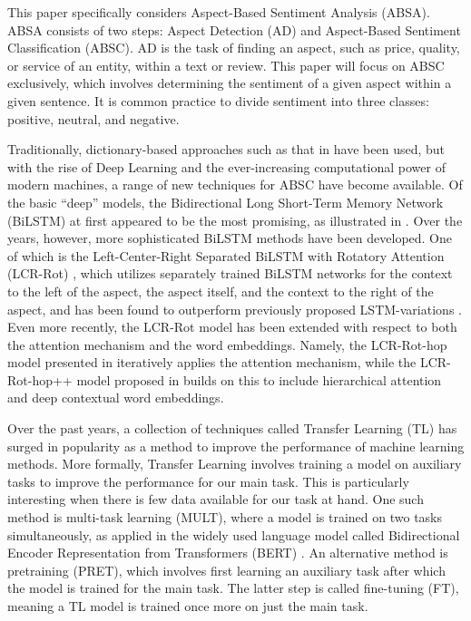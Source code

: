 \documentclass[runningheads]{llncs}
\begin{document}
This paper specifically considers Aspect-Based Sentiment Analysis (ABSA). ABSA consists of two steps: Aspect Detection (AD) and Aspect-Based Sentiment Classification (ABSC). AD is the task of finding an aspect, such as price, quality, or service of an entity, within a text or review. This paper will focus on ABSC exclusively, which involves determining the sentiment of a given aspect within a given sentence\cite{brauwers2021, Schouten2017}. It is common practice to divide sentiment into three classes: positive, neutral, and negative.

Traditionally, dictionary-based approaches such as that in \cite{Hu2004} have been used, but with the rise of Deep Learning and the ever-increasing computational power of modern machines, a range of new techniques for ABSC have become available. Of the basic ``deep'' models, the Bidirectional Long Short-Term Memory Network (BiLSTM) at first appeared to be the most promising, as illustrated in \cite{Graves2005}. Over the years, however, more sophisticated BiLSTM methods have been developed. One of which is the Left-Center-Right Separated BiLSTM with Rotatory Attention (LCR-Rot) \cite{Zheng2018}, which utilizes separately trained BiLSTM networks for the context to the left of the aspect, the aspect itself, and the context to the right of the aspect, and has been found to outperform previously proposed LSTM-variations \cite{Zheng2018}. Even more recently, the LCR-Rot model has been extended with respect to both the attention mechanism and the word embeddings. Namely, the LCR-Rot-hop model presented in \cite{Wallaart2019} iteratively applies the attention mechanism, while the LCR-Rot-hop++ model proposed in \cite{Trusca2020} builds on this to include hierarchical attention and deep contextual word embeddings. 

Over the past years, a collection of techniques called Transfer Learning (TL) has surged in popularity as a method to improve the performance of machine learning methods. More formally, Transfer Learning involves training a model on auxiliary tasks to improve the performance for our main task. This is particularly interesting when there is few data available for our task at hand. One such method is multi-task learning (MULT), where a model is trained on two tasks simultaneously, as applied in the widely used language model called Bidirectional Encoder Representation from Transformers (BERT) \cite{Devlin2019}. An alternative method is pretraining (PRET), which involves first learning an auxiliary task after which the model is trained for the main task. The latter step is called fine-tuning (FT), meaning a TL model is trained once more on just the main task.
\end{document}
